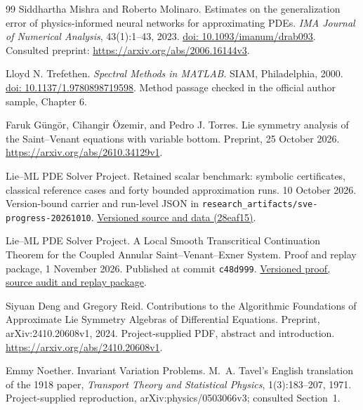 \documentclass[12pt,a4paper,oneside]{report}
\numberwithin{equation}{chapter}
\theoremstyle{remark}\newtheorem{remark}[theorem]{Remark}
\DeclareRobustCommand{\code}[1]{\nolinkurl{#1}}
\newcommand{\doi}[1]{\href{https://doi.org/#1}{doi: #1}}
\begin{document}
\begin{thebibliography}{99}
Siddhartha Mishra and Roberto Molinaro. Estimates on the generalization error of physics-informed neural networks for approximating PDEs. \emph{IMA Journal of Numerical Analysis}, 43(1):1--43, 2023. \doi{10.1093/imanum/drab093}. Consulted preprint: \url{https://arxiv.org/abs/2006.16144v3}.

Lloyd N. Trefethen. \emph{Spectral Methods in MATLAB}. SIAM, Philadelphia, 2000. \doi{10.1137/1.9780898719598}. Method passage checked in the official author sample, Chapter 6.

Faruk G\"ung\"or, Cihangir \"Ozemir, and Pedro J. Torres. Lie symmetry analysis of the Saint--Venant equations with variable bottom. Preprint, 25 October 2026. \url{https://arxiv.org/abs/2610.34129v1}.

Lie--ML PDE Solver Project. Retained scalar benchmark: symbolic certificates,
classical reference cases and forty bounded approximation runs. 10 October 2026.
Version-bound carrier and run-level JSON in \code{research_artifacts/sve-progress-20261010}.
\href{https://github.com/CarlXerophilem/Lie-ML_PDES/tree/28eaf15237d58654a841be84f3e066f340b5f17d/research_artifacts/sve-progress-20261010}{Versioned source and data (28eaf15)}.

Lie--ML PDE Solver Project. A Local Smooth Transcritical Continuation Theorem
for the Coupled Annular Saint--Venant--Exner System. Proof and replay package,
1 November 2026. Published at commit \code{c48d999}.
\href{https://github.com/CarlXerophilem/Lie-ML_PDES/tree/c48d9994e4bfaf69a91913c73a59e7ef8f1e1bf7/research_artifacts/annular-transcritical-theorem-20261101}{Versioned proof, source audit and replay package}.

Siyuan Deng and Gregory Reid. Contributions to the Algorithmic Foundations of
Approximate Lie Symmetry Algebras of Differential Equations. Preprint,
arXiv:2410.20608v1, 2024. Project-supplied PDF, abstract and introduction.
\url{https://arxiv.org/abs/2410.20608v1}.

Emmy Noether. Invariant Variation Problems. M.~A. Tavel's English translation
of the 1918 paper, \emph{Transport Theory and Statistical Physics},
1(3):183--207, 1971. Project-supplied reproduction,
arXiv:physics/0503066v3; consulted Section~1.


\end{thebibliography}
\end{document}
